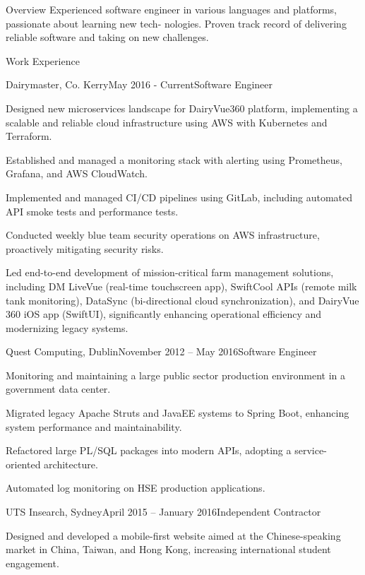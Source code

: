 \documentclass{résumé}
\begin{document}
\begin{rSection}{Overview}
    Experienced software engineer in various languages and platforms, passionate about learning new tech- nologies. Proven track record of delivering reliable software and taking on new challenges.
\end{rSection}

\begin{rSection}{Work Experience}

\begin{rSubsection}{Dairymaster, Co. Kerry}{May 2016 - Current}{Software Engineer}{}
    \item Designed new microservices landscape for DairyVue360 platform, implementing a scalable and reliable cloud infrastructure using AWS with Kubernetes and Terraform.
    \item Established and managed a monitoring stack with alerting using Prometheus, Grafana, and AWS CloudWatch.
    \item Implemented and managed CI/CD pipelines using GitLab, including automated API smoke tests and performance tests.
    \item Conducted weekly blue team security operations on AWS infrastructure, proactively mitigating security risks.
    \item Led end-to-end development of mission-critical farm management solutions, including DM LiveVue (real-time touchscreen app), SwiftCool APIs (remote milk tank monitoring), DataSync (bi-directional cloud synchronization), and DairyVue 360 iOS app (SwiftUI), significantly enhancing operational efficiency and modernizing legacy systems.
\end{rSubsection}

\begin{rSubsection}{Quest Computing, Dublin}{November 2012 – May 2016}{Software Engineer}{}
    \item Monitoring and maintaining a large public sector production environment in a government data center.
    \item Migrated legacy Apache Struts and JavaEE systems to Spring Boot, enhancing system performance and maintainability.
    \item Refactored large PL/SQL packages into modern APIs, adopting a service-oriented architecture.
    \item Automated log monitoring on HSE production applications.
\end{rSubsection}

\begin{rSubsection}{UTS Insearch, Sydney}{April 2015 – January 2016}{Independent Contractor}{}
    \item Designed and developed a mobile-first website aimed at the Chinese-speaking market in China, Taiwan, and Hong Kong, increasing international student engagement.
\end{rSubsection}


\end{rSection}
\end{document}
